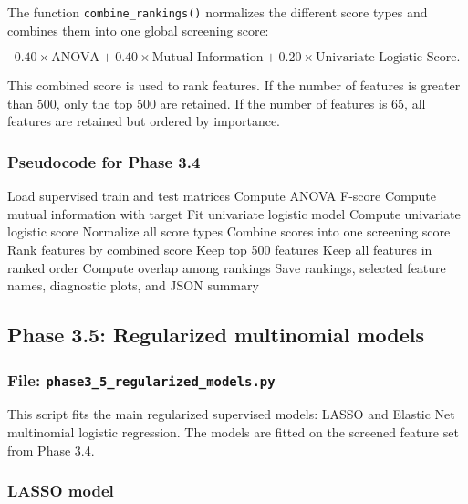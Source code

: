 \documentclass{ipgpmaster}
\begin{document}
The function \texttt{combine\_rankings()} normalizes the different score types and combines them into one global screening score:

\[
0.40 \times \text{ANOVA}
+
0.40 \times \text{Mutual Information}
+
0.20 \times \text{Univariate Logistic Score}.
\]

This combined score is used to rank features. If the number of features is greater than 500, only the top 500 are retained. If the number of features is 65, all features are retained but ordered by importance.

\subsubsection{Pseudocode for Phase 3.4}

\begin{algorithm}[H]
\caption{Phase 3.4: Feature screening}
\begin{algorithmic}[1]
\State Load supervised train and test matrices
    \State Compute ANOVA F-score
    \State Compute mutual information with target
    \State Fit univariate logistic model
    \State Compute univariate logistic score
\EndFor
\State Normalize all score types
\State Combine scores into one screening score
\State Rank features by combined score
    \State Keep top 500 features
\Else
    \State Keep all features in ranked order
\EndIf
\State Compute overlap among rankings
\State Save rankings, selected feature names, diagnostic plots, and JSON summary
\end{algorithmic}
\end{algorithm}

\subsection{Phase 3.5: Regularized multinomial models}

\subsubsection{File: \texttt{phase3\_5\_regularized\_models.py}}

This script fits the main regularized supervised models: LASSO and Elastic Net multinomial logistic regression. The models are fitted on the screened feature set from Phase 3.4.

\subsubsection{LASSO model}
\end{document}
